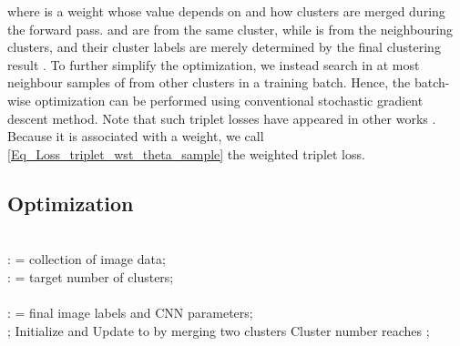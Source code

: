 \documentclass[10pt,twocolumn,letterpaper]{article}
\begin{document}
{where  is a weight whose value depends on  and how clusters are merged during the forward pass.}  and  are from the same cluster, while  is from the neighbouring clusters, {and their cluster labels are merely determined by the final clustering result . To further simplify the optimization, {we instead search  in at most  neighbour samples of  from other clusters in a training batch.}} Hence, the batch-wise optimization can be performed using conventional stochastic gradient {descent} method. {Note that such triplet losses have appeared in other works \cite{wang2014learning, schroff2015facenet}.} Because it is associated with a weight, we call \eqref{Eq_Loss_triplet_wst_theta_sample} the weighted triplet loss.

\subsection{Optimization}
\label{Sec_Optimization}
\begin{algorithm}[t]
\caption{Joint Optimization on  and }
\begin{algorithmic}[1]
\REQUIRE ~~\\
      : = collection of image data; \\
      : = target number of clusters; \\
\ENSURE ~~\\
      : = final image labels and CNN parameters;\\
\STATE ; 
\STATE Initialize  and 
\REPEAT
\STATE Update  to  by merging two clusters
\IF{} 
\STATE 
\ENDIF
\STATE 
\UNTIL Cluster number reaches 
\STATE ; 
\end{algorithmic}
\label{Alg_Optimization}
\end{algorithm}
\end{document}
